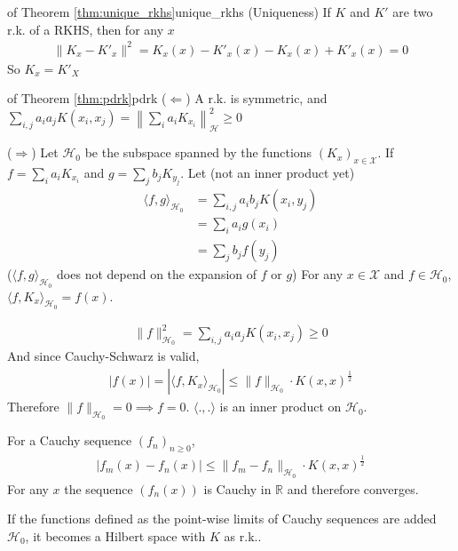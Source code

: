\documentclass{article}
\begin{document}
\begin{Proof}{of Theorem \ref{thm:unique_rkhs}}{unique_rkhs}
  (Uniqueness) If $K$ and $K'$ are two r.k. of a RKHS, then for any $x$
  \begin{align*}
    \lVert K_x - K'_x\rVert^2 = K_x(x) - K'_x(x) - K_x(x) + K'_x(x) = 0
  \end{align*}
  So $K_x = K'_X$

\end{Proof}

\begin{Proof}{of Theorem \ref{thm:pdrk}}{pdrk}
  ($\Leftarrow$) A r.k. is symmetric, and $\sum_{i,j} a_i a_j K(x_i, x_j)
   = \left\lVert \sum_i a_i K_{x_i} \right\rVert^2_\mathcal{H} \geq 0$

  \vspace{10pt}
  ($\Rightarrow$) Let $\mathcal{H}_0$ be the subspace spanned by the functions 
  $(K_x)_{x\in \mathcal{X}}$. If $f = \sum_i a_i K_{x_i}$ and $g =
  \sum_j b_j K_{y_j}$. Let (not an inner product yet)
  \begin{align*}
    \langle f, g\rangle_{\mathcal{H}_0} &= \sum_{i,j}a_i b_j K(x_i, y_j)\\
    &= \sum_i a_i g(x_i)\\
    &= \sum_j b_j f(y_j)
  \end{align*}
  ($\langle f,g \rangle_{\mathcal{H}_0}$ does not depend on the expansion of $f$
  or $g$) For any $x\in \mathcal{X}$ and $f \in \mathcal{H}_0$, $\langle f,K_x 
  \rangle_{\mathcal{H}_0} = f(x)$.

  \begin{align*}
    \lVert f \rVert^2_{\mathcal{H}_0} = \sum_{i,j} a_i a_j K(x_i, x_j) \geq 0
  \end{align*}
  And since Cauchy-Schwarz is valid, 
  \begin{align*}
    |f(x)| = |\langle f, K_x \rangle_{\mathcal{H}_0}| \leq \lVert f 
    \rVert_{\mathcal{H}_0}\cdot K(x,x)^{\frac{1}{2}}
  \end{align*}
  Therefore $\lVert f \rVert_{\mathcal{H}_0} = 0 \implies f = 0$. $\langle ., .
  \rangle$ is an inner product on $\mathcal{H}_0$. 

  For a Cauchy sequence $(f_n)_{n\geq 0}$, 
  \begin{align*}
    |f_m(x) - f_n(x)| \leq \lVert f_m - f_n \rVert_{\mathcal{H}_0} \cdot
    K(x, x)^{\frac{1}{2}}
  \end{align*}
  For any $x$ the sequence $(f_n(x))$ is Cauchy in $\mathbb{R}$ and therefore
  converges. 

  If the functions defined as the point-wise limits of Cauchy sequences are
  added $\mathcal{H}_0$, it becomes a Hilbert space with $K$ as r.k..
\end{Proof}
\end{document}
